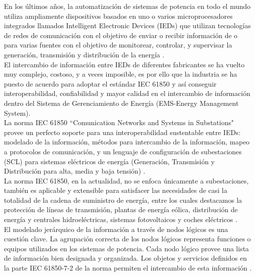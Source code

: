 \documentclass[conference,twocolumn]{IEEEtran}
\begin{document}
En los \'ultimos a\~nos, la automatizaci\'on de sistemas de potencia en todo el mundo utiliza ampliamente dispositivos basados en uno o varios microprocesadores \cite{Santoso2000, Schwarz2000} integrados llamados Intelligent Electronic Devices (IEDs)  que utilizan tecnolog\'ias de redes de comunicaci\'on con el objetivo de enviar o recibir informaci\'on de o para varias fuentes con el objetivo de monitorear, controlar, y supervisar la generaci\'on, transmisi\'on y distribuci\'on de la energ\'ia \cite{McDonald2007, IEEE1997, Schwarz2008}.\\

El intercambio de informaci\'on entre IEDs de diferentes fabricantes se ha vuelto muy complejo, costoso, y a veces imposible, es por ello que la industria se ha puesto de acuerdo para adoptar el est\'andar IEC 61850 y as\'i conseguir interoperabilidad, confiabilidad y mayor calidad en el intercambio de informaci\'on dentro del Sistema de Gerenciamiento de Energ\'ia (EMS-Energy Management System). \\

La norma IEC 61850 ``Comunication Networks and Systems in Substations" provee un perfecto soporte para una interoperabilidad sustentable entre IEDs: modelado de la informaci\'on, m\'etodos para intercambio de la informaci\'on, mapeo a protocolos de comunicaci\'on, y un lenguaje de configuraci\'on de subestaciones (SCL) para sistemas el\'ectricos de energ\'ia (Generaci\'on, Transmisi\'on y Distribuci\'on para alta, media y baja tensi\'on) \cite{Schwarz2008}. \\

La norma IEC 61850, en la actualidad, no se enfoca \'unicamente a subestaciones, tambi\'en es aplicable y extensible para satisfacer las necesidades de casi la totalidad de la cadena de suministro de energ\'ia, entre los cuales destacamos la protecci\'on de l\'ineas de transmisi\'on, plantas de energ\'ia e\'olica, distribuci\'on de energ\'ia y centrales hidroel\'ectricas, sistemas fotovoltaicos y coches el\'ectricos \cite{Schwarz2005, DER2009, German2009}. \\

El modelado jer\'arquico de la informaci\'on a trav\'es de nodos l\'ogicos es una cuesti\'on clave. La agrupaci\'on correcta de los nodos l\'ogicos representa funciones o equipos utilizados en los sistemas de potencia. Cada nodo l\'ogico provee una lista de informaci\'on bien designada y organizada. Los objetos y servicios definidos en la parte IEC 61850-7-2 de la norma permiten el intercambio de esta informaci\'on \cite{TC572004}.\\
\end{document}

